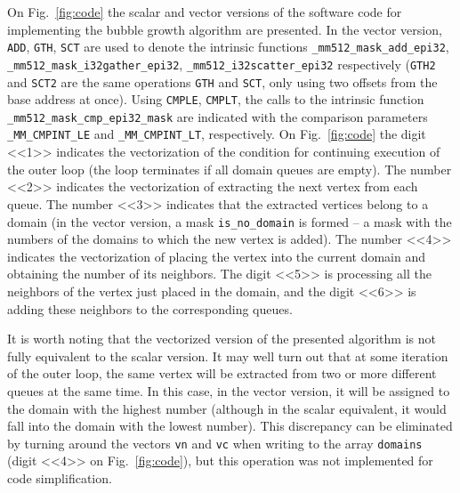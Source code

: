 \documentclass[
11pt,%
tightenlines,%
twoside,%
onecolumn,%
nofloats,%
nobibnotes,%
nofootinbib,%
superscriptaddress,%
noshowpacs,%
centertags]%
{revtex4}
\begin{document}
On Fig.~\ref{fig:code} the scalar and vector versions of the software code for implementing the bubble growth algorithm are presented.
In the vector version, \texttt{ADD}, \texttt{GTH}, \texttt{SCT} are used to denote the intrinsic functions \texttt{\_mm512\_mask\_add\_epi32}, \texttt{\_mm512\_mask\_i32gather\_epi32}, \texttt{\_mm512\_i32scatter\_epi32} respectively (\texttt{GTH2} and \texttt{SCT2} are the same operations \texttt{GTH} and \texttt{SCT}, only using two offsets from the base address at once).
Using \texttt{CMPLE}, \texttt{CMPLT}, the calls to the intrinsic function \texttt{\_mm512\_mask\_cmp\_epi32\_mask} are indicated with the comparison parameters \texttt{\_MM\_CMPINT\_LE} and \texttt{\_MM\_CMPINT\_LT}, respectively.
On Fig.~\ref{fig:code} the digit <<1>> indicates the vectorization of the condition for continuing execution of the outer loop (the loop terminates if all domain queues are empty).
The number <<2>> indicates the vectorization of extracting the next vertex from each queue.
The number <<3>> indicates that the extracted vertices belong to a domain (in the vector version, a mask \texttt{is\_no\_domain} is formed -- a mask with the numbers of the domains to which the new vertex is added).
The number <<4>> indicates the vectorization of placing the vertex into the current domain and obtaining the number of its neighbors.
The digit <<5>> is processing all the neighbors of the vertex just placed in the domain, and the digit <<6>> is adding these neighbors to the corresponding queues.

It is worth noting that the vectorized version of the presented algorithm is not fully equivalent to the scalar version.
It may well turn out that at some iteration of the outer loop, the same vertex will be extracted from two or more different queues at the same time.
In this case, in the vector version, it will be assigned to the domain with the highest number (although in the scalar equivalent, it would fall into the domain with the lowest number).
This discrepancy can be eliminated by turning around the vectors \texttt{vn} and \texttt{vc} when writing to the array \texttt{domains} (digit <<4>> on Fig.~\ref{fig:code}), but this operation was not implemented for code simplification.
\end{document}
